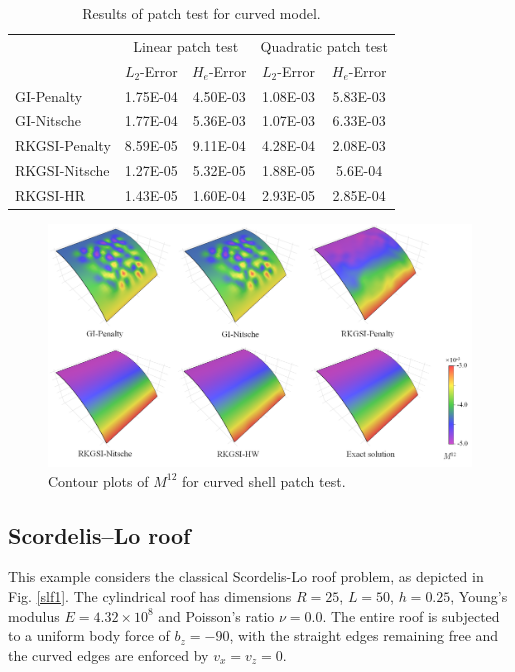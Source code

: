 \begin{table}[!ht]
\centering
\caption{Results of patch test for curved model.}\label{ptt2}
\begin{tabular}{lcccc}
\toprule
 & \multicolumn{2}{c}{Linear patch test} & \multicolumn{2}{c}{Quadratic patch test} \\ \cline{2-5}
 & $L_2$-Error & $H_e$-Error & $L_2$-Error & $H_e$-Error \\
    \midrule
    GI-Penalty & 1.75E-04 & 4.50E-03 & 1.08E-03 & 5.83E-03 \\
    GI-Nitsche & 1.77E-04 & 5.36E-03 & 1.07E-03 & 6.33E-03 \\
    RKGSI-Penalty & 8.59E-05 & 9.11E-04 & 4.28E-04 & 2.08E-03 \\
    RKGSI-Nitsche & 1.27E-05 & 5.32E-05 & 1.88E-05 & 5.6E-04 \\
    RKGSI-HR & 1.43E-05 & 1.60E-04 & 2.93E-05 & 2.85E-04 \\
    \bottomrule
\end{tabular}
\end{table}

\begin{figure}[!ht]
\centering
\includegraphics[width=\textwidth]{figures/ptc_r2}
\caption{Contour plots of $M^{12}$ for curved shell patch test.}\label{ptf2}
\end{figure}

\subsection{Scordelis--Lo roof}
This example considers the classical Scordelis-Lo roof problem, as depicted in Fig. \ref{slf1}. The cylindrical roof has dimensions $R=25$, $L=50$, $h=0.25$, Young's modulus $E=4.32\times 10^8$ and Poisson's ratio $\nu=0.0$. The entire roof is subjected to a uniform body force of $b_z = -90$, with the straight edges remaining free and the curved edges are enforced by $v_x=v_z=0$.

